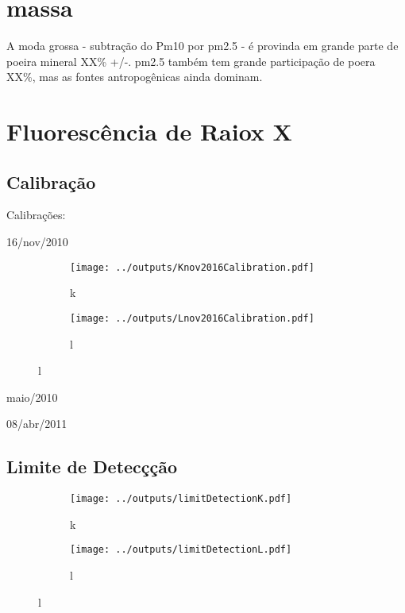 \section{massa}

A moda grossa - subtração do Pm10 por pm2.5 - é provinda em grande parte
de poeira mineral XX\% +/-. pm2.5 também tem grande participação de poera XX\%, 
mas as fontes antropogênicas ainda dominam.

\section{Fluorescência de Raiox X}

\subsection{Calibração}

Calibrações:

16/nov/2010

\begin{figure}[H]
  \caption{}
  \begin{subfigure}[b]{0.5\textwidth}
    \texttt{[image: ../outputs/Knov2016Calibration.pdf]}
    \caption{k}
  \end{subfigure}%
  \begin{subfigure}[b]{0.5\textwidth}
    \texttt{[image: ../outputs/Lnov2016Calibration.pdf]}
    \caption{l}
  \end{subfigure}
\end{figure}


maio/2010

08/abr/2011


\subsection{Limite de Detecçção}

\begin{figure}[H]
  \caption{}
  \begin{subfigure}[b]{0.5\textwidth}
    \texttt{[image: ../outputs/limitDetectionK.pdf]}
    \caption{k}
  \end{subfigure}%
  \begin{subfigure}[b]{0.5\textwidth}
    \texttt{[image: ../outputs/limitDetectionL.pdf]}
    \caption{l}
  \end{subfigure}
\end{figure}


